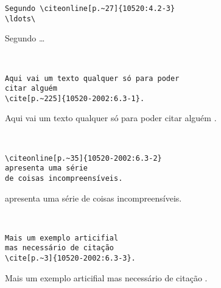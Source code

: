 \documentclass[espacosimples]{abnt}
\newcommand{\VerbL}{0.54\textwidth}
\newcommand{\LatL}{0.45\textwidth}
\begin{document}
\noindent\begin{minipage}[t]{\VerbL}\small\begin{verbatim}
Segundo 
\ldots\
\end{verbatim}\end{minipage}\begin{minipage}[t]{\LatL}\small
Segundo \citeonline[p.~27]{10520:4.2-3}\ldots\ 
\end{minipage}\vspace{5mm}\\

\noindent\begin{minipage}[t]{\VerbL}\small\begin{verbatim}
Aqui vai um texto qualquer só para poder
citar alguém
\cite[p.~225]{10520-2002:6.3-1}.
\end{verbatim}\end{minipage}\begin{minipage}[t]{\LatL}\small
Aqui vai um texto qualquer só para poder
citar alguém
\cite[p.~225]{10520-2002:6.3-1}.
\end{minipage}\vspace{5mm}\\

\noindent\begin{minipage}[t]{\VerbL}\small\begin{verbatim}
\citeonline[p.~35]{10520-2002:6.3-2}
apresenta uma série
de coisas incompreensíveis.
\end{verbatim}\end{minipage}\begin{minipage}[t]{\LatL}\small
{}
apresenta uma série
de coisas incompreensíveis.
\end{minipage}\vspace{5mm}\\

\noindent\begin{minipage}[t]{\VerbL}\small\begin{verbatim}
Mais um exemplo articifial
mas necessário de citação
\cite[p.~3]{10520-2002:6.3-3}.
\end{verbatim}\end{minipage}\begin{minipage}[t]{\LatL}\small
Mais um exemplo articifial
mas necessário de citação
\cite[p.~3]{10520-2002:6.3-3}.
\end{minipage}\vspace{5mm}\\
\end{document}

